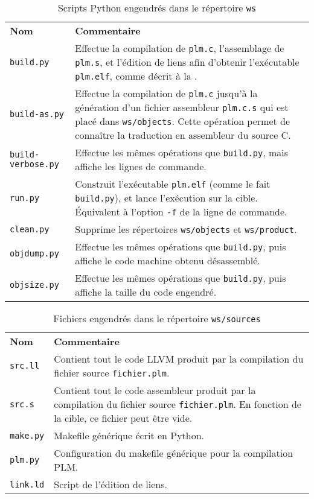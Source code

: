 \begin{table}[t!]
\centering
\begin{tabular}{p{2cm}p{11cm}}
  \textbf{Nom} & \textbf{Commentaire} \\
  \texttt{build.py} & Effectue la compilation de \texttt{plm.c}, l'assemblage de \texttt{plm.s}, et l'édition de liens afin d'obtenir l'exécutable \texttt{plm.elf}, comme décrit à la {}{compilationProgrammePLM}. \\
  \texttt{build-as.py} & Effectue la compilation de \texttt{plm.c} jusqu'à la génération d'un fichier assembleur \texttt{plm.c.s} qui est placé dans \texttt{ws/objects}. Cette opération permet de connaître la traduction en assembleur du source C.\\
  \texttt{build-verbose.py} & Effectue les mêmes opérations que \texttt{build.py}, mais affiche les lignes de commande.\\
  \texttt{run.py} & Construit l'exécutable \texttt{plm.elf} (comme le fait \texttt{build.py}), et lance l'exécution sur la cible. Équivalent à l'option \texttt{-f} de la ligne de commande. \\
  \texttt{clean.py} & Supprime les répertoires \texttt{ws/objects} et \texttt{ws/product}. \\
  \texttt{objdump.py} & Effectue les mêmes opérations que \texttt{build.py}, puis affiche le code machine obtenu désassemblé. \\
  \texttt{objsize.py} & Effectue les mêmes opérations que \texttt{build.py}, puis affiche la taille du code engendré. \\
\end{tabular}
\caption{Scripts Python engendrés dans le répertoire \texttt{ws}}
\ligne
\end{table}

\begin{table}[t!]
\centering
\begin{tabular}{p{2cm}p{11cm}}
  \textbf{Nom} & \textbf{Commentaire} \\
  \texttt{src.ll} & Contient tout le code LLVM produit par la compilation du fichier source {\tt f{}ichier.plm}. \\
  \texttt{src.s} & Contient tout le code assembleur produit par la compilation du fichier source {\tt f{}ichier.plm}. En fonction de la cible, ce fichier peut être vide.\\
  \texttt{make.py} & Makefile générique écrit en Python.\\
  \texttt{plm.py} & Configuration du makefile générique pour la compilation PLM.\\
  \texttt{link.ld} & Script de l'édition de liens.\\
\end{tabular}
\caption{Fichiers engendrés dans le répertoire \texttt{ws/sources}}
\ligne
\end{table}

